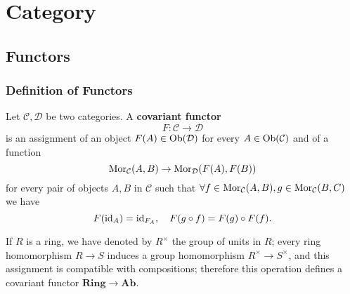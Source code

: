\chapter{Category}
\section{Functors}
\subsection{Definition of Functors}
Let $\mathcal{C},\mathcal{D}$ be two categories. A \textbf{covariant functor}
\[F:\mathcal{C}\to\mathcal{D}\]
is an assignment of an object $F(A)\in\mathrm{Ob}(\mathcal{D})$ for every $A\in\mathrm{Ob}(\mathcal{C})$ and of a function
\[\mathrm{Mor}_{\mathcal{C}}(A,B)\to\mathrm{Mor}_{\mathcal{D}}(F(A),F(B))\]
for every pair of objects $A,B$ in $\mathcal{C}$ such that $\forall f\in\mathrm{Mor}_{\mathcal{C}}(A,B),g\in\mathrm{Mor}_{\mathcal{C}}(B,C)$ we have
\[F(\operatorname{id}_A)=\operatorname{id}_{F_{A}},\quad F(g\circ f)=F(g)\circ F(f).\]

\begin{example}
If $R$ is a ring, we have denoted by $R^{\times}$ the group of units in $R$; every ring homomorphism $R\to S$ induces a group homomorphism $R^{\times}\to S^{\times}$, and this assignment is compatible with compositions; therefore this operation defines a covariant functor $\mathbf{Ring}\to\mathbf{Ab}$.
\end{example}

